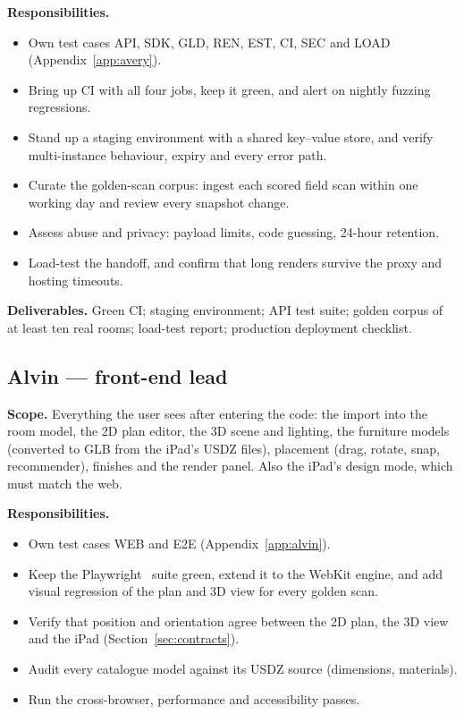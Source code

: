 \documentclass[conference,a4paper,10pt]{IEEEtran}
\begin{document}
\textbf{Responsibilities.}
\begin{itemize}
\item Own test cases API, SDK, GLD, REN, EST, CI, SEC and LOAD
  (Appendix~\ref{app:avery}).
\item Bring up CI with all four jobs, keep it green, and alert on nightly
  fuzzing regressions.
\item Stand up a staging environment with a shared key--value store, and
  verify multi-instance behaviour, expiry and every error path.
\item Curate the golden-scan corpus: ingest each scored field scan within one
  working day and review every snapshot change.
\item Assess abuse and privacy: payload limits, code guessing, 24-hour
  retention.
\item Load-test the handoff, and confirm that long renders survive the
  proxy and hosting timeouts.
\end{itemize}

\textbf{Deliverables.} Green CI; staging environment; API test suite; golden
corpus of at least ten real rooms; load-test report; production deployment
checklist.

\subsection{Alvin --- front-end lead}

\textbf{Scope.} Everything the user sees after entering the code: the import
into the room model, the 2D plan editor, the 3D scene and lighting, the
furniture models (converted to GLB from the iPad's USDZ files), placement
(drag, rotate, snap, recommender), finishes and the render panel. Also the
iPad's design mode, which must match the web.

\textbf{Responsibilities.}
\begin{itemize}
\item Own test cases WEB and E2E (Appendix~\ref{app:alvin}).
\item Keep the Playwright~\cite{playwright} suite green, extend it to the
  WebKit engine, and add visual regression of the plan and 3D view for every
  golden scan.
\item Verify that position and orientation agree between the 2D plan, the 3D
  view and the iPad (Section~\ref{sec:contracts}).
\item Audit every catalogue model against its USDZ source (dimensions,
  materials).
\item Run the cross-browser, performance and accessibility passes.
\end{itemize}
\end{document}
